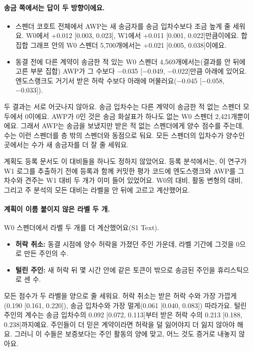 \paragraph{송금 쪽에서는 답이 두 방향이에요.}
\begin{itemize}
\item 스펜더 코호트 전체에서 AWP는 새 송금자를 송금 입차수보다 조금 높게 줄 세워요. W0에서 +0.012 [0.003, 0.023], W1에서 +0.011 [0.001, 0.022]만큼이에요. 합집합 그래프 안의 W0 스펜더 5,700개에서는 +0.021 [0.005, 0.038]이에요.
\item 동결 전에 다른 계약이 송금한 적 있는 W0 스펜더 4,569개에서는(결과를 안 뒤에 고른 부분 집합) AWP가 그 수보다 −0.035 [−0.049, −0.022]만큼 아래에 있어요. 엔도스랭크도 거기서 받은 허락 수보다 아래에 머물러요(−0.045 [−0.058, −0.033]).
\end{itemize}
두 결과는 서로 어긋나지 않아요. 송금 입차수는 다른 계약이 송금한 적 없는 스펜더 모두에서 0이에요. AWP가 0인 것은 송금 화살표가 하나도 없는 W0 스펜더 2,421개뿐이에요. 그래서 AWP는 송금을 보냈지만 받은 적 없는 스펜더에게 양수 점수를 주는데, 수는 이런 스펜더를 층 밖의 스펜더와 동점으로 둬요. 모든 스펜더의 입차수가 양수인 곳에서는 수가 새 송금자를 더 잘 줄 세워요.

계획도 등록 문서도 이 대비들을 하나도 정하지 않았어요. 등록 분석에서는, 이 연구가 W1 로그를 추출하기 전에 등록과 함께 커밋한 평가 코드에 엔도스랭크와 AWP를 그 차수와 견주는 W1 대비 두 개가 이미 들어 있었어요. W0의 대비, 활동 변형의 대비, 그리고 주 분석의 모든 대비는 라벨을 안 뒤에 고르고 계산했어요.

\paragraph{계획이 이름 붙이지 않은 라벨 두 개.}
W0 스펜더에서 라벨 두 개를 더 계산했어요(S1 Text).
\begin{itemize}
\item \textbf{허락 취소:} 동결 시점에 양수 허락을 가졌던 주인 가운데, 라벨 기간에 그것을 0으로 만든 주인의 수.
\item \textbf{털린 주인:} 새 허락 뒤 몇 시간 안에 같은 토큰이 밖으로 송금된 주인을 휴리스틱으로 센 수.
\end{itemize}
모든 점수가 두 라벨을 양으로 줄 세워요. 허락 취소는 받은 허락 수와 가장 가깝게(0.190 [0.161, 0.220]), 송금 입차수와 가장 멀게(0.061 [0.040, 0.083]) 따라가요. 털린 주인의 계수는 송금 입차수의 0.092 [0.072, 0.113]부터 받은 허락 수의 0.213 [0.188, 0.238]까지예요. 주인들이 더 믿은 계약이라면 허락을 덜 잃어야지 더 잃지 않아야 해요. 그러니 이 수들은 보증보다는 주인 활동의 양에 맞고, 어느 것도 증거로 내놓지 않아요.

